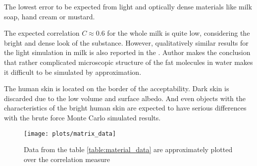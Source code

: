 The lowest error to be expected from light and optically dense materials like milk soap, hand cream
or mustard.

The expected correlation $C\approx0.6$ for the whole milk is quite low, considering the bright and
dense look of the substance. However, qualitatively similar results for the light simulation in milk
is also reported in the \cite{Donner:2009:EBM}. Author makes the conclusion that rather
complicated microscopic structure of the fat molecules in water makes it difficult to be simulated
by approximation.

The human skin is located on the border of the acceptability. Dark skin is discarded due to
the low volume and surface albedo. And even objects with the characteristics of the
bright human skin are expected to have serious differences with the brute force Monte Carlo
simulated results.

\begin{figure}
    \texttt{[image: plots/matrix\_data]}
    \caption{Data from the table \ref{table:material_data} are approximately plotted over the
    correlation measure}
    \label{fig:material_props_data}
\end{figure}